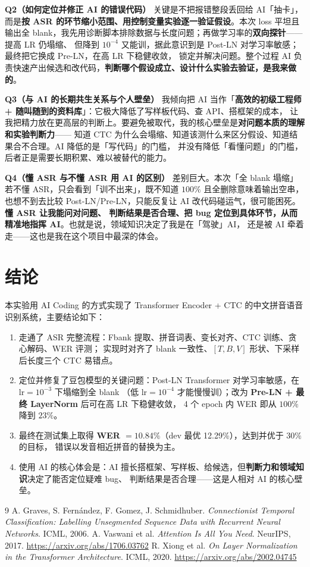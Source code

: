 \documentclass[a4paper]{article}
\newcommand{\devWER}{12.29}      %
\newcommand{\testWER}{10.84}     %
\begin{document}
\textbf{Q2（如何定位并修正 AI 的错误代码）}\quad
关键是不把报错整段丢回给 AI「抽卡」，而是\textbf{按 ASR 的环节缩小范围、用控制变量实验逐一验证假设}。本次
loss 平坦且输出全 blank，我先用诊断脚本排除数据与长度问题；再做学习率的\textbf{双向探针}——提高 LR 仍塌缩、
但降到 $10^{-4}$ 又能训，据此意识到是 Post-LN 对学习率敏感；最终把它换成 Pre-LN，在高 LR 下稳健收敛，
锁定并解决问题。整个过程 AI 负责快速产出候选和改代码，\textbf{判断哪个假设成立、设计什么实验去验证，是我来做的}。

\textbf{Q3（与 AI 的长期共生关系与个人壁垒）}\quad
我倾向把 AI 当作「\textbf{高效的初级工程师 + 随叫随到的资料库}」：它极大降低了写样板代码、查 API、搭框架的成本，
让我把精力放在更高层的判断上。要避免被取代，我的核心壁垒是\textbf{对问题本质的理解和实验判断力}——
知道 CTC 为什么会塌缩、知道该测什么来区分假设、知道结果合不合理。AI 降低的是「写代码」的门槛，
并没有降低「看懂问题」的门槛，后者正是需要长期积累、难以被替代的能力。

\textbf{Q4（懂 ASR 与不懂 ASR 用 AI 的区别）}\quad
差别巨大。本次「全 blank 塌缩」若不懂 ASR，只会看到「训不出来」，既不知道 $100\%$ 且全删除意味着输出空串，
也想不到去比较 Post-LN/Pre-LN，只能反复让 AI 改代码碰运气，很可能困死。\textbf{懂 ASR 让我能问对问题、
判断结果是否合理、把 bug 定位到具体环节，从而精准地指挥 AI}。也就是说，领域知识决定了我是在「驾驶」AI，
还是被 AI 牵着走——这也是我在这个项目中最深的体会。

\section{结论}
本实验用 AI Coding 的方式实现了 Transformer Encoder + CTC 的中文拼音语音识别系统，主要结论如下：
\begin{enumerate}
  \item 走通了 ASR 完整流程：Fbank 提取、拼音词表、变长对齐、CTC 训练、贪心解码、WER 评测；
        实现时对齐了 blank 一致性、$[T,B,V]$ 形状、下采样后长度三个 CTC 易错点。
  \item 定位并修复了豆包模型的关键问题：Post-LN Transformer 对学习率敏感，在 $\text{lr}=10^{-3}$ 下塌缩到全 blank
        （低 $\text{lr}=10^{-4}$ 才能慢慢训）；改为 \textbf{Pre-LN + 最终 LayerNorm} 后可在高 LR 下稳健收敛，
        4 个 epoch 内 WER 即从 $100\%$ 降到 $23\%$。
  \item 最终在测试集上取得 \textbf{WER $=\testWER\%$}（dev 最优 \devWER\%），达到并优于 $30\%$ 的目标，
        错误以发音相近拼音的替换为主。
  \item 使用 AI 的核心体会是：AI 擅长搭框架、写样板、给候选，但\textbf{判断力和领域知识}决定了能否定位疑难 bug、
        判断结果是否合理——这是人相对 AI 的核心壁垒。
\end{enumerate}

\begin{thebibliography}{9}
 A. Graves, S. Fern\'andez, F. Gomez, J. Schmidhuber.
  \emph{Connectionist Temporal Classification: Labelling Unsegmented Sequence Data with Recurrent Neural Networks}.
  ICML, 2006.
 A. Vaswani et al. \emph{Attention Is All You Need}. NeurIPS, 2017.
  \url{https://arxiv.org/abs/1706.03762}
 R. Xiong et al. \emph{On Layer Normalization in the Transformer Architecture}.
  ICML, 2020. \url{https://arxiv.org/abs/2002.04745}
\end{thebibliography}
\end{document}
